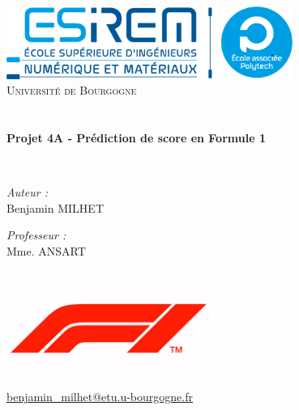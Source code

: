 \begin{titlepage}
    \begin{center}
    
    \includegraphics[width=0.7\textwidth]{images/esirem.png}~\\[1cm]
    
    \textsc{\LARGE Université de Bourgogne}\\[1.5cm]
    
    \textsc{\Large }\\[0.5cm]
    
    \HRule \\[0.4cm]
    
    {
    \huge \bfseries Projet 4A - Prédiction de score en Formule 1\\[0.4cm]
    }
    
    \HRule \\[1.5cm]
    
    \begin{minipage}{0.4\textwidth}
    \begin{flushleft} \large
    \emph{Auteur :}\\
    Benjamin \textsc{MILHET} 

    \end{flushleft}
    \end{minipage}
    \begin{minipage}{0.4\textwidth}
    \begin{flushright} \large
    \emph{Professeur :} \\
    Mme. \textsc{ANSART}\\
    
    \end{flushright}
    \end{minipage}

   

    
    \vfill
        
    \includegraphics[width=0.5\textwidth]{images/logoF1.jpg}~\\[3cm]
    \href{mailto:benjamin_milhet@etu.u-bourgogne.fr}{benjamin\_milhet@etu.u-bourgogne.fr}\\[.5cm]
    
    \end{center}
    \end{titlepage}